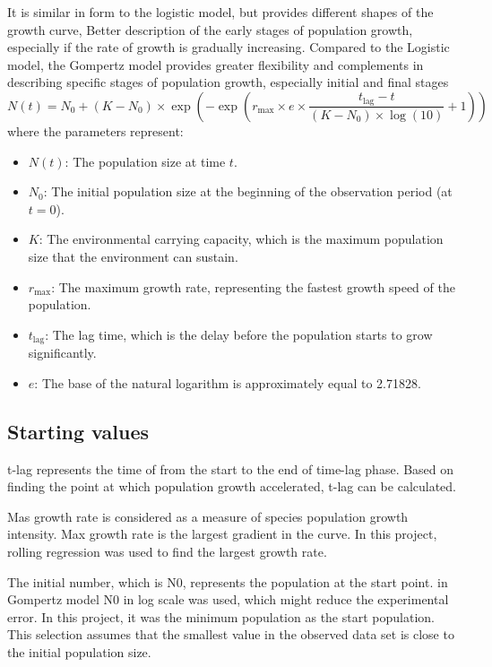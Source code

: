 \documentclass[11pt]{article}
\begin{document}
It is similar in form to the logistic model, but provides different shapes of the growth curve, Better description of the early stages of population growth, especially if the rate of growth is gradually increasing\cite{zwietering1990}. Compared to the Logistic model, the Gompertz model provides greater flexibility and complements in describing specific stages of population growth, especially initial and final stages
\begin{equation}
    N(t) = N_0 + (K - N_0) \times \exp\left(-\exp\left(r_{\text{max}} \times e \times \frac{t_{\text{lag}} - t}{(K - N_0) \times \log(10)} + 1\right)\right)
\end{equation}
where the parameters represent:
\begin{itemize}
    \item $N(t)$: The population size at time $t$.
    \item $N_0$: The initial population size at the beginning of the observation period (at $t = 0$).
    \item $K$: The environmental carrying capacity, which is the maximum population size that the environment can sustain.
    \item $r_{\text{max}}$: The maximum growth rate, representing the fastest growth speed of the population.
    \item $t_{\text{lag}}$: The lag time, which is the delay before the population starts to grow significantly.
    \item $e$: The base of the natural logarithm is approximately equal to 2.71828.
\end{itemize}

\subsection{Starting values}
t-lag represents the time of from the start to the end of time-lag phase. Based on finding the point at which population growth accelerated, t-lag can be calculated. 

Mas growth rate is considered as a measure of species population growth intensity. Max growth rate is the largest gradient in the curve. In this project, rolling regression was used to find the largest growth rate.

The initial number, which is N0, represents the population at the start point. in Gompertz model N0 in log scale was used, which might reduce the experimental error\cite{peleg2011}. In this project, it was the minimum population as the start population. This selection assumes that the smallest value in the observed data set is close to the initial population size.
\end{document}
